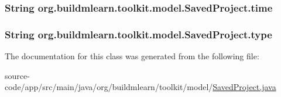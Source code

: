 \subsubsection[{\texorpdfstring{time}{time}}]{\setlength{\rightskip}{0pt plus 5cm}String org.\+buildmlearn.\+toolkit.\+model.\+Saved\+Project.\+time\hspace{0.3cm}{\ttfamily [private]}}\hypertarget{classorg_1_1buildmlearn_1_1toolkit_1_1model_1_1SavedProject_a2ee63cfcb4cedf66e5d46fd02632d88b}{}\label{classorg_1_1buildmlearn_1_1toolkit_1_1model_1_1SavedProject_a2ee63cfcb4cedf66e5d46fd02632d88b}
\subsubsection[{\texorpdfstring{type}{type}}]{\setlength{\rightskip}{0pt plus 5cm}String org.\+buildmlearn.\+toolkit.\+model.\+Saved\+Project.\+type\hspace{0.3cm}{\ttfamily [private]}}\hypertarget{classorg_1_1buildmlearn_1_1toolkit_1_1model_1_1SavedProject_a8c4244d47e13f8ed782485b6ae80a8b8}{}\label{classorg_1_1buildmlearn_1_1toolkit_1_1model_1_1SavedProject_a8c4244d47e13f8ed782485b6ae80a8b8}


The documentation for this class was generated from the following file\+:\begin{DoxyCompactItemize}
\item 
source-\/code/app/src/main/java/org/buildmlearn/toolkit/model/\hyperlink{SavedProject_8java}{Saved\+Project.\+java}\end{DoxyCompactItemize}
